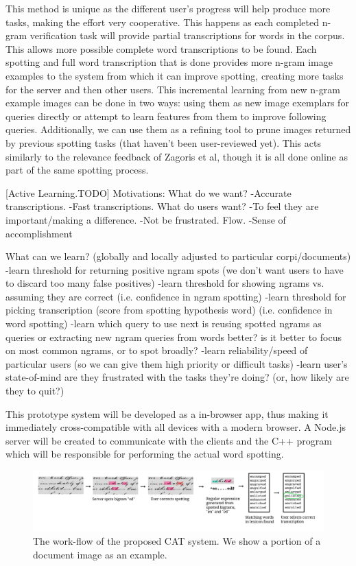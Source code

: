 \documentclass[ms]{byuprop}
\begin{document}
This method is unique as the different user's progress will help produce more tasks, making the effort very cooperative. This happens as each completed n-gram verification task will provide partial transcriptions for words in the corpus. This allows more possible complete word transcriptions to be found. Each spotting and full word transcription that is done provides more n-gram image examples to the system from which it can improve spotting, creating more tasks for the server and then other users. This incremental learning from new n-gram example images can be done in two ways: using them as new image exemplars for queries directly or attempt to learn features from them to improve following queries. Additionally, we can use them as a refining tool to prune images returned by previous spotting tasks (that haven't been user-reviewed yet). This acts similarly to the relevance feedback of Zagoris et al\cite{Zagoris2015}, though it is all done online as part of the same spotting process.

[Active Learning.TODO]
Motivations:
What do we want?
-Accurate transcriptions.
-Fast transcriptions.
What do users want?
-To feel they are important/making a difference.
-Not be frustrated. Flow.
-Sense of accomplishment

What can we learn? (globally and locally adjusted to particular corpi/documents)
-learn threshold for returning positive ngram spots (we don't want users to have to discard too many false positives)
-learn threshold for showing ngrams vs. assuming they are correct (i.e. confidence in ngram spotting)
-learn threshold for picking transcription (score from spotting hypothesis word) (i.e. confidence in word spotting)
-learn which query to use next
	is reusing spotted ngrams as queries or extracting new ngram queries from words better?
	is it better to focus on most common ngrams, or to spot broadly?
-learn reliability/speed of particular users (so we can give them high priority or difficult tasks)
-learn user's state-of-mind
	are they frustrated with the tasks they're doing? (or, how likely are they to quit?)
	




This prototype system will be developed as a in-browser app, thus making it immediately cross-compatible with all devices with a modern browser. A Node.js server will be created to communicate with the clients and the C++ program which will be responsible for performing the actual word spotting.

\begin{figure}[h]
    \centering
    \includegraphics[width=.98\textwidth]{flow}
    \caption{The work-flow of the proposed CAT system. We show a portion of a document image as an example.}
    \label{fig:system_diagram}
\end{figure}
\end{document}
